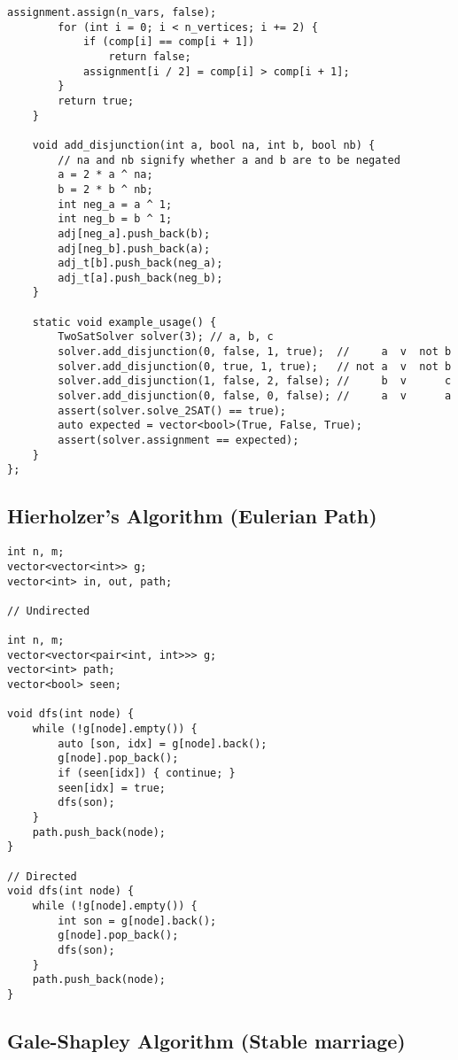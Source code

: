 \documentclass[10pt]{article}
\begin{document}
\begin{multicols*}{2}
\begin{lstlisting}[style=compactcpp]
        assignment.assign(n_vars, false);
        for (int i = 0; i < n_vertices; i += 2) {
            if (comp[i] == comp[i + 1])
                return false;
            assignment[i / 2] = comp[i] > comp[i + 1];
        }
        return true;
    }

    void add_disjunction(int a, bool na, int b, bool nb) {
        // na and nb signify whether a and b are to be negated 
        a = 2 * a ^ na;
        b = 2 * b ^ nb;
        int neg_a = a ^ 1;
        int neg_b = b ^ 1;
        adj[neg_a].push_back(b);
        adj[neg_b].push_back(a);
        adj_t[b].push_back(neg_a);
        adj_t[a].push_back(neg_b);
    }

    static void example_usage() {
        TwoSatSolver solver(3); // a, b, c
        solver.add_disjunction(0, false, 1, true);  //     a  v  not b
        solver.add_disjunction(0, true, 1, true);   // not a  v  not b
        solver.add_disjunction(1, false, 2, false); //     b  v      c
        solver.add_disjunction(0, false, 0, false); //     a  v      a
        assert(solver.solve_2SAT() == true);
        auto expected = vector<bool>(True, False, True);
        assert(solver.assignment == expected);
    }
};
\end{lstlisting}

\subsection{Hierholzer's Algorithm (Eulerian Path)}

\begin{lstlisting}[style=compactcpp]
int n, m;
vector<vector<int>> g;
vector<int> in, out, path;

// Undirected

int n, m;
vector<vector<pair<int, int>>> g;
vector<int> path;
vector<bool> seen;

void dfs(int node) {
	while (!g[node].empty()) {
		auto [son, idx] = g[node].back();
		g[node].pop_back();
		if (seen[idx]) { continue; }
		seen[idx] = true;
		dfs(son);
	}
	path.push_back(node);
}

// Directed
void dfs(int node) {
	while (!g[node].empty()) {
		int son = g[node].back();
		g[node].pop_back();
		dfs(son);
	}
	path.push_back(node);
}

\end{lstlisting}

\subsection{Gale-Shapley Algorithm (Stable marriage)}


\end{multicols*}
\end{document}
